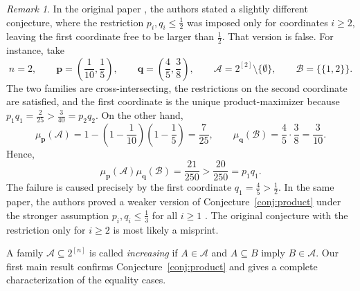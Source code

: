 \documentclass[11pt]{article}
\numberwithin{equation}{section}
\theoremstyle{definition}
\theoremstyle{remark}
\newtheorem{remark}[theorem]{Remark}
\begin{document}
\begin{remark}\label{rem1}
 In the original paper  \cite{STT}, the authors stated a slightly different conjecture, where the restriction $p_i,q_i \le \frac{1}{2}$ was imposed only for coordinates $i \geq 2$, leaving the first coordinate free to be larger than $\frac{1}{2}$. That version is false. For instance, take 
$$n=2,\qquad
 \mathbf p=\left(\frac1{10},\frac15\right),\qquad
 \mathbf q=\left(\frac45,\frac38\right),\qquad \mathcal{A}=2^{[2]}\setminus\{\emptyset\},\qquad\mathcal{B}=\bigl\{\{1,2\}\bigr\}.
$$
The two families are cross-intersecting, the restrictions on the second coordinate are satisfied, and the first coordinate is the unique product-maximizer because
$
 p_1q_1=\frac{2}{25}>\frac{3}{40}=p_2q_2.
$
On the other hand,
\begin{equation*}
 \mu_{\mathbf p}(\mathcal{A})
 =1-\left(1-\frac1{10}\right)\left(1-\frac15\right)
 =\frac7{25},
 \qquad
 \mu_{\mathbf q}(\mathcal{B})
 =\frac45\cdot\frac38
 =\frac3{10}.
\end{equation*}
Hence,
\begin{equation*}
 \mu_{\mathbf p}(\mathcal{A})\mu_{\mathbf q}(\mathcal{B})
 =\frac{21}{250}
 >\frac{20}{250}
 =p_1q_1.
\end{equation*}
The failure is caused precisely by the first coordinate $q_1=\frac{4}{5}>\frac{1}{2}$. In the same paper, the authors proved a weaker version of  Conjecture~\ref{conj:product} under the stronger assumption $p_i, q_i \le \frac{1}{3}$ for all $i\geq 1$  \cite[Theorem 3]{STT}. The original conjecture with the restriction only for $i \geq 2$ is most likely a misprint.
\end{remark}


\medskip
A family $\mathcal{A}\subseteq 2^{[n]}$ is called \textit{increasing} if $A\in\mathcal{A}$ and $A\subseteq B$ imply $B\in\mathcal{A}$.
Our first main result confirms Conjecture~\ref{conj:product}  and gives a complete characterization of the equality cases.
\end{document}
